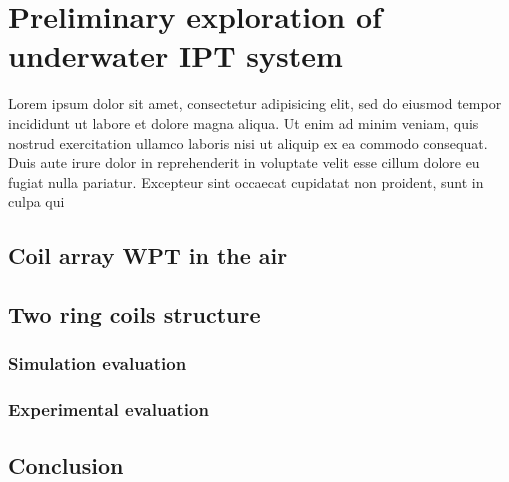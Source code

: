 \chapter{Preliminary exploration of underwater IPT system}
 Lorem ipsum dolor sit amet, consectetur adipisicing elit,
 sed do eiusmod tempor incididunt ut labore et dolore magna aliqua.
 Ut enim ad minim veniam, quis nostrud exercitation ullamco laboris nisi ut aliquip ex ea commodo consequat.
 Duis aute irure dolor in reprehenderit in voluptate velit esse cillum dolore eu fugiat nulla pariatur.
 Excepteur sint occaecat cupidatat non proident, sunt in culpa qui
 \section{Coil array WPT in the air}
 \section{Two ring coils structure}
 \subsection{Simulation evaluation}
 \subsection{Experimental evaluation}

 \section{Conclusion}